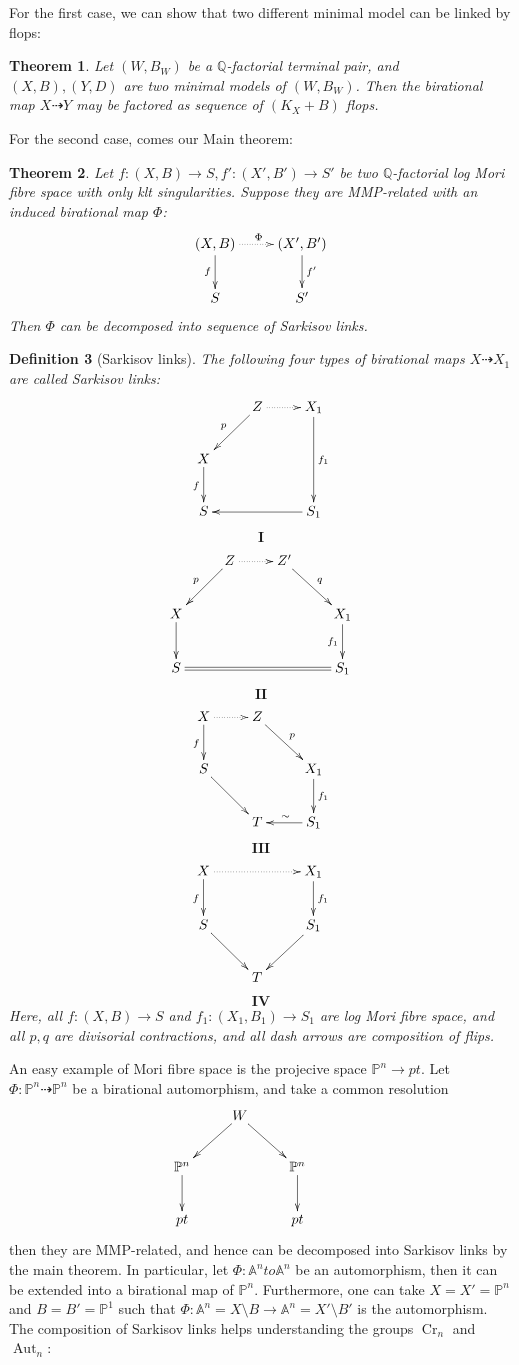 \documentclass{article}
\newtheorem{defn}{Definition}[subsection]
\newtheorem{thm}[defn]{Theorem}
\begin{document}
For the first case, we can show that two different minimal model can be linked by flops:
\begin{thm}
  Let $(W,B_W)$ be a $\mathbb{Q}$-factorial terminal pair, and $(X,B),(Y,D)$ are two minimal models of $(W,B_W)$. Then the birational map $X\dashrightarrow Y$ may be factored as sequence of $(K_X+B)$ flops. 
\end{thm}
For the second case, comes our Main theorem:

\begin{thm}
  Let $ f:(X,B)\to S,f':(X',B')\to S' $ be two $ \mathbb{Q} $-factorial log Mori fibre space  with only klt singularities. Suppose they are  MMP-related with an induced  birational map $\Phi$:
  \[ \xymatrix{
    (X,B)\ar[d]_f\ar@{.>}[r]^\Phi&(X',B')\ar[d]^{f'}\\
    S&S'} \]
  Then $ \Phi  $ can be decomposed into sequence of Sarkisov links.
  \end{thm}
\begin{defn}[Sarkisov links]

  The following four types of  birational maps $X\dashrightarrow X_1$ are called Sarkisov links: 
  \[ \xymatrix{
    &Z\ar[ld]_p\ar@{.>}[r]&X_1\ar[dd]^{f_1}\\
    X\ar[d]_f&&\\
    S &&S_1\ar[ll]}\]
  \[ \textbf{I} \]
  \[ \xymatrix{
    &Z\ar[ld]_p\ar@{.>}[r]&Z'\ar[dr]^{q}&\\
    X\ar[d]&&&X_1\ar[d]_{f_1}\\
    S\ar@{=}[rrr]&&&S_1} \]
  \[ \textbf{II} \]
  \[ \xymatrix{
    X\ar[d]_f\ar@{.>}[r]&Z\ar[rd]^{p}&\\
    S\ar[dr]&&X_1\ar[d]^{f_1}\\
    &T&S_1\ar[l]_\sim}\]
  \[ \textbf{III} \]
  \[ \xymatrix{
    X\ar[d]_f\ar@{.>}[rr]&&X_1\ar[d]^{f_1}\\
    S\ar[dr]&&S_1\ar[dl]\\
    &T &}\]
  \[ \textbf{IV} \]
  Here, all $ f:(X,B)\to S $ and $ f_1:(X_1,B_1)\to S_1 $ are log Mori fibre space, and all $ p,q $ are divisorial contractions, and all dash arrows are composition of flips. 
\end{defn}
  An easy example of Mori fibre space is the projecive space $\mathbb{P}^{n}\to pt$. Let $\Phi : \mathbb{P}^{n}\dashrightarrow \mathbb{P}^{n}$ be a birational automorphism, and take a common resolution
  \[
    \xymatrix{
      &W \ar[ld]\ar[rd]&&\\
      \mathbb{P}^{n}\ar[d]& &\mathbb{P}^{n}\ar[d]\\
      pt &&pt
    }
  \]
  then they are MMP-related, and hence can be decomposed into Sarkisov links by the main theorem. In particular, let $\Phi :\mathbb{A}^{n}to \mathbb{A}^{n}$ be an automorphism, then it can be extended into a birational map of $\mathbb{P}^{n}$. Furthermore, one can take $X=X'=\mathbb{P}^{n}$ and $B=B'=\mathbb{P}^{1}$ such that $\Phi: \mathbb{A}^{n}=X\setminus B\to \mathbb{A}^{n}=X'\setminus B'$ is the automorphism. The composition of Sarkisov links helps understanding the groups $\operatorname{Cr}_n$ and $\operatorname{Aut}_n$:
  
\end{document}

